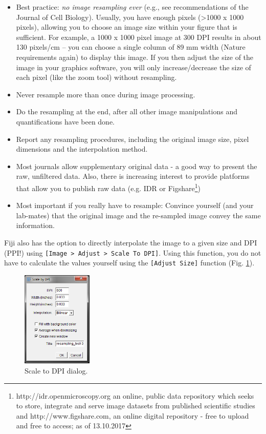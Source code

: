 \begin{itemize}
	\item Best practice: \emph{no image resampling ever} (e.g., see recommendations of the Journal of Cell Biology). Usually, you have enough pixels (>1000 x 1000 pixels), allowing you to choose an image size within your figure that is sufficient. For example, a 1000 x 1000 pixel image at 300 DPI results in about 130 pixels/cm -- you can choose a single column of 89 mm width (Nature requirements again) to display this image. If you then adjust the size of the image in your graphics software, you will only increase/decrease the size of each pixel (like the zoom tool) without resampling.
	\item Never resample more than once during image processing.
	\item Do the resampling at the end, after all other image manipulations and quantifications have been done.	
	\item Report any resampling procedures, including the original image size, pixel dimensions and the interpolation method.
	\item Most journals allow supplementary original data - a good
          way to present the raw, unfiltered data. Also, there is
          increasing interest to provide platforms that allow you to
          publish raw data (e.g. IDR or
          Figshare\footnote{http://idr.openmicroscopy.org an online,
            public data repository which seeks to store, integrate and
            serve image datasets from published scientific studies and
            http://www.figshare.com, an online digital repository - free to upload and free to access; as of 13.10.2017})
	\item Most important if you really have to resample: Convince yourself (and your lab-mates) that the original image and the re-sampled image convey the same information.
\end{itemize}

Fiji also has the option to directly interpolate the image to a given size and DPI (PPI!) using \texttt{[Image > Adjust > Scale To DPI]}. Using this function, you do not have to calculate the values yourself using the \texttt{[Adjust Size]} function (Fig. \ref{fig:scale-to-dpi-dialog}).
\begin{figure}[!h]
	\centering
		\includegraphics[width=0.3\textwidth]{mod1/figures/scale-to-dpi-dialog.png}
	\caption{Scale to DPI dialog.}
	\label{fig:scale-to-dpi-dialog}
\end{figure}

